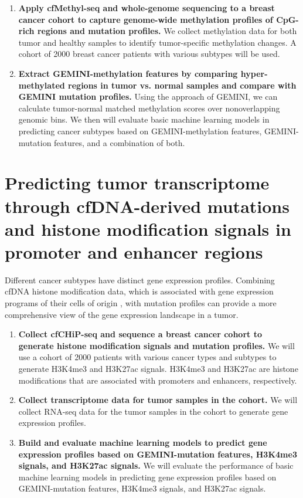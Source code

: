 \documentclass[11pt]{article}
\begin{document}
\begin{enumerate}
	\item \textbf{Apply cfMethyl-seq \cite{stackpole_cost-effective_2022} and whole-genome sequencing to a breast cancer cohort to capture genome-wide methylation profiles of CpG-rich regions and mutation profiles.} We collect methylation data for both tumor and healthy samples to identify tumor-specific methylation changes. A cohort of 2000 breast cancer patients with various subtypes will be used.
	\item \textbf{Extract GEMINI-methylation features by comparing hyper-methylated regions in tumor vs. normal samples and compare with GEMINI mutation profiles.} Using the approach of GEMINI, we can calculate tumor-normal matched methylation scores over nonoverlapping genomic bins. We then will evaluate basic machine learning models in predicting cancer subtypes based on GEMINI-methylation features, GEMINI-mutation features, and a combination of both.
\end{enumerate}

\section*{Predicting tumor transcriptome through cfDNA-derived mutations and histone modification signals in promoter and enhancer regions}
Different cancer subtypes have distinct gene expression profiles. Combining cfDNA histone modification data, which is associated with gene expression programs of their cells of origin \cite{sadeh_chip-seq_2021, trier_maansson_cell-free_2023}, with mutation profiles can provide a more comprehensive view of the gene expression landscape in a tumor.
\begin{enumerate}
	\item \textbf{Collect cfCHiP-seq \cite{baca_liquid_2023} and sequence a breast cancer cohort to generate histone modification signals and mutation profiles.} We will use a cohort of 2000 patients with various cancer types and subtypes to generate H3K4me3 and H3K27ac signals. H3K4me3 and H3K27ac are histone modifications that are associated with promoters and enhancers, respectively.
	\item \textbf{Collect transcriptome data for tumor samples in the cohort.} We will collect RNA-seq data for the tumor samples in the cohort to generate gene expression profiles.
	\item \textbf{Build and evaluate machine learning models to predict gene expression profiles based on GEMINI-mutation features, H3K4me3 signals, and H3K27ac signals.} We will evaluate the performance of basic machine learning models in predicting gene expression profiles based on GEMINI-mutation features, H3K4me3 signals, and H3K27ac signals. 
\end{enumerate}
\end{document}
